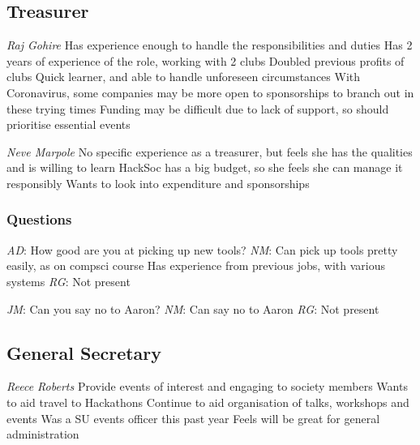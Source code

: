 \documentclass[11pt]{meetingmins}
\begin{document}
\subsection{Treasurer}
\begin{items}
	\item
	\textit{Raj Gohire}
		\subitem
		Has experience enough to handle the responsibilities and duties
		\subitem
		Has 2 years of experience of the role, working with 2 clubs
		\subitem
		Doubled previous profits of clubs
		\subitem
		Quick learner, and able to handle unforeseen circumstances
		\subitem
		With Coronavirus, some companies may be more open to sponsorships to branch out in these trying times
		\subitem
		Funding may be difficult due to lack of support, so should prioritise essential events

	\item
	\textit{Neve Marpole}
		\subitem
		No specific experience as a treasurer, but feels she has the qualities and is willing to learn
		\subitem
		HackSoc has a big budget, so she feels she can manage it responsibly
		\subitem
		Wants to look into expenditure and sponsorships

\end{items}

\subsubsection{Questions}	
\begin{items}
	\item
	\textit{AD}: How good are you at picking up new tools?
		\subitem
		\textit{NM}:
			\subsubitem
			Can pick up tools pretty easily, as on compsci course
			\subsubitem
			Has experience from previous jobs, with various systems
		\subitem
		\textit{RG}:
			\subsubitem
			Not present
	\item
	\textit{JM}: Can you say no to Aaron?
		\subitem
		\textit{NM}: Can say no to Aaron
		\subitem
		\textit{RG}: Not present
\end{items}

\subsection{General Secretary}
\begin{items}
	\item
	\textit{Reece Roberts}
		\subitem
		Provide events of interest and engaging to society members
		\subitem
		Wants to aid travel to Hackathons
		\subitem
		Continue to aid organisation of talks, workshops and events
		\subitem
		Was a SU events officer this past year
		\subitem
		Feels will be great for general administration
\end{items}
\end{document}
